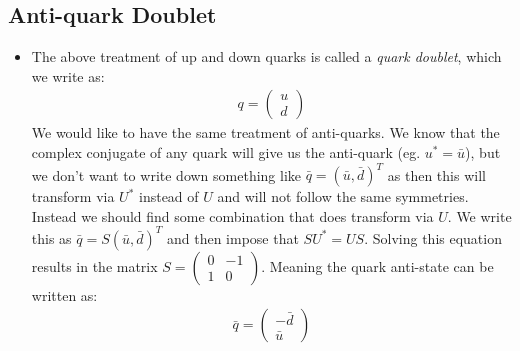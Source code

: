 \documentclass[11pt]{article}
\numberwithin{equation}{section}
\begin{document}
\subsection{Anti-quark Doublet} %
\label{sub:anti_quark_doublet}
\begin{itemize}
    \item The above treatment of up and down quarks is called a \emph{quark doublet}, which we write as:
    \begin{align*}
        q = \left(\begin{matrix}
            u \\ d
        \end{matrix}\right)
    \end{align*}
We would like to have the same treatment of anti-quarks. We know that the complex conjugate of any quark will give us the anti-quark (eg. $u^{\ast} = \bar{u}$), but we don't want to write down something like $\bar{q} = (\bar{u},\bar{d})^{T}$ as then this will transform via $U^{\ast}$ instead of $U$ and will not follow the same symmetries. Instead we should find some combination that does transform via $U$. We write this as $\bar{q} = S(\bar{u},\bar{d})^{T}$ and then impose that $SU^{\ast} = US$. Solving this equation results in the matrix $S= \begin{pmatrix}
    0 & -1 \\ 1 & 0 
\end{pmatrix}$. Meaning the quark anti-state can be written as:
\begin{align*}
    \bar{q} = \begin{pmatrix}
        -\bar{d} \\ \bar{u}
    \end{pmatrix}
\end{align*}

\end{itemize}
\end{document}
